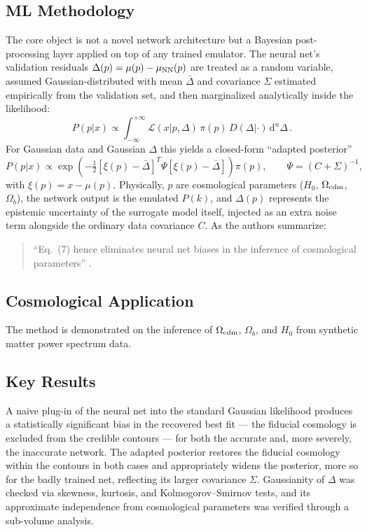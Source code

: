\documentclass[11pt]{article}
\begin{document}
\subsection{ML Methodology}
The core object is not a novel network architecture but a Bayesian post-processing layer applied on top of any trained emulator. The neural net's validation residuals $\Delta(p)=\mu(p)-\mu_{\rm NN}(p)$ are treated as a random variable, assumed Gaussian-distributed with mean $\bar{\Delta}$ and covariance $\Sigma$ estimated empirically from the validation set, and then marginalized analytically inside the likelihood:
\begin{equation}
P(p|x) \propto \int_{-\infty}^{+\infty} \mathcal{L}(x|p,\Delta)\,\pi(p)\,D(\Delta|\cdot)\,\mathrm{d}^n\Delta \, .
\end{equation}
For Gaussian data and Gaussian $\Delta$ this yields a closed-form ``adapted posterior''
\begin{equation}
P(p|x) \propto \exp\left(-\tfrac{1}{2}\left[\xi(p)-\bar\Delta\right]^{T}\Psi\left[\xi(p)-\bar\Delta\right]\right)\pi(p),\qquad \Psi=(C+\Sigma)^{-1},
\end{equation}
with $\xi(p)=x-\mu(p)$. Physically, $p$ are cosmological parameters ($H_0$, $\Omega_{\rm cdm}$, $\Omega_b$), the network output is the emulated $P(k)$, and $\Delta(p)$ represents the epistemic uncertainty of the surrogate model itself, injected as an extra noise term alongside the ordinary data covariance $C$. As the authors summarize:

\begin{quote}
\enquote{Eq.\ (7) hence eliminates neural net biases in the inference of cosmological parameters} \citep[p.~3]{grandon2022bayesian}.
\end{quote}

\subsection{Cosmological Application}
The method is demonstrated on the inference of $\Omega_{\rm cdm}$, $\Omega_b$, and $H_0$ from synthetic matter power spectrum data.

\subsection{Key Results}
A naive plug-in of the neural net into the standard Gaussian likelihood produces a statistically significant bias in the recovered best fit — the fiducial cosmology is excluded from the credible contours — for both the accurate and, more severely, the inaccurate network. The adapted posterior restores the fiducial cosmology within the contours in both cases and appropriately widens the posterior, more so for the badly trained net, reflecting its larger covariance $\Sigma$. Gaussianity of $\Delta$ was checked via skewness, kurtosis, and Kolmogorov–Smirnov tests, and its approximate independence from cosmological parameters was verified through a sub-volume analysis.
\end{document}
